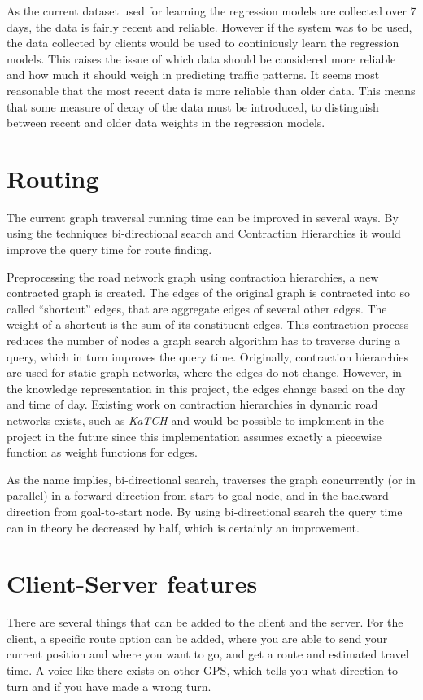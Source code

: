 As the current dataset used for learning the regression models are collected over 7 days, the data is fairly recent and reliable. However if the system was to be used, the data collected by clients would be used to continiously learn the regression models. This raises the issue of which data should be considered more reliable and how much it should weigh in predicting traffic patterns. It seems most reasonable that the most recent data is more reliable than older data. This means that some measure of decay of the data must be introduced, to distinguish between recent and older data weights in the regression models.

\section{Routing}
The current graph traversal running time can be improved in several ways. By using the techniques bi-directional search and Contraction Hierarchies it would improve the query time for route finding.

Preprocessing the road network graph using contraction hierarchies, a new contracted graph is created. The edges of the original graph is contracted into so called “shortcut” edges, that are aggregate edges of  several other edges. The weight of a shortcut is the sum of its constituent edges. This contraction process reduces the number of nodes a graph search algorithm has to traverse during a query, which in turn improves the query time. 
Originally, contraction hierarchies are used for static graph networks, where the edges do not change. However, in the knowledge representation in this project, the edges change based on the day and time of day. Existing work on  contraction hierarchies in dynamic road networks exists,  such as \emph{KaTCH}\cite{KaTCH}\cite{KaTCHi} and would be possible to implement in the project in the future since this implementation assumes exactly a piecewise function as weight functions for edges.

As the name implies, bi-directional search, traverses the graph concurrently (or in parallel) in a forward direction from start-to-goal node, and in the backward direction from goal-to-start node. By using bi-directional search the query time can in theory be decreased by half, which is certainly an improvement.

\section{Client-Server features}
There are several things that can be added to the client and the server. For the client, a specific route option can be added, where you are able to send your current position and where you want to go, and get a route and estimated travel time. A voice like there exists on other GPS, which tells you what direction to turn and if you have made a wrong turn.

